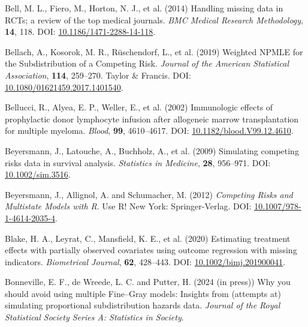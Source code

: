 \documentclass[
  letterpaper,
  DIV=11,
  numbers=noendperiod]{scrreprt}
\newlength{\cslhangindent}
\newenvironment{CSLReferences}[2] %
 {\begin{list}{}{%
  \setlength{\itemindent}{0pt}
  \setlength{\leftmargin}{0pt}
  \setlength{\parsep}{0pt}
  \ifodd #1
   \setlength{\leftmargin}{\cslhangindent}
   \setlength{\itemindent}{-1\cslhangindent}
  \fi
  \setlength{\itemsep}{#2\baselineskip}}}
 {\end{list}}
\begin{document}
\begin{CSLReferences}{1}{1}
Bell, M. L., Fiero, M., Horton, N. J., et al. (2014) Handling missing
data in {RCTs}; a review of the top medical journals. \emph{BMC Medical
Research Methodology}, \textbf{14}, 118. DOI:
\href{https://doi.org/10.1186/1471-2288-14-118}{10.1186/1471-2288-14-118}.

Bellach, A., Kosorok, M. R., Rüschendorf, L., et al. (2019) Weighted
{NPMLE} for the {Subdistribution} of a {Competing Risk}. \emph{Journal
of the American Statistical Association}, \textbf{114}, 259--270. Taylor
\& Francis. DOI:
\href{https://doi.org/10.1080/01621459.2017.1401540}{10.1080/01621459.2017.1401540}.

Bellucci, R., Alyea, E. P., Weller, E., et al. (2002) Immunologic
effects of prophylactic donor lymphocyte infusion after allogeneic
marrow transplantation for multiple myeloma. \emph{Blood}, \textbf{99},
4610--4617. DOI:
\href{https://doi.org/10.1182/blood.V99.12.4610}{10.1182/blood.V99.12.4610}.

Beyersmann, J., Latouche, A., Buchholz, A., et al. (2009) Simulating
competing risks data in survival analysis. \emph{Statistics in
Medicine}, \textbf{28}, 956--971. DOI:
\href{https://doi.org/10.1002/sim.3516}{10.1002/sim.3516}.

Beyersmann, J., Allignol, A. and Schumacher, M. (2012) \emph{Competing
{Risks} and {Multistate Models} with {R}}. Use {R}! New York:
Springer-Verlag. DOI:
\href{https://doi.org/10.1007/978-1-4614-2035-4}{10.1007/978-1-4614-2035-4}.

Blake, H. A., Leyrat, C., Mansfield, K. E., et al. (2020) Estimating
treatment effects with partially observed covariates using outcome
regression with missing indicators. \emph{Biometrical Journal},
\textbf{62}, 428--443. DOI:
\href{https://doi.org/10.1002/bimj.201900041}{10.1002/bimj.201900041}.

Bonneville, E. F., de Wreede, L. C. and Putter, H. (2024 (in press)) Why
you should avoid using multiple {Fine}--{Gray} models: Insights from
(attempts at) simulating proportional subdistribution hazards data.
\emph{Journal of the Royal Statistical Society Series A: Statistics in
Society}.


\end{CSLReferences}
\end{document}
